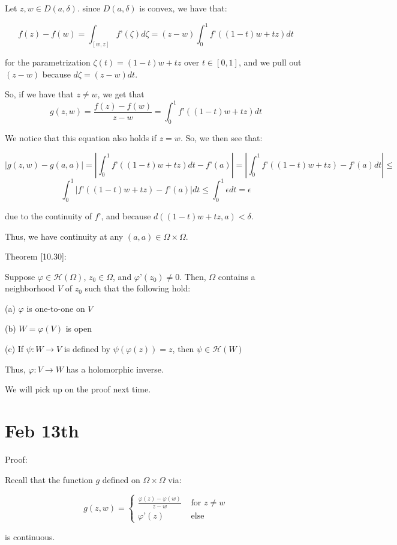 \documentclass[10pt]{article}
\newcommand{\calH}{\mathcal{H}}
\begin{document}
Let $z,w \in D(a,\delta)$. since $D(a, \delta)$ is convex, we have that:

$$ f(z) - f(w) = \int_{[w,z]} f’(\zeta) d\zeta = (z-w) \int_0^1 f’((1-t)w + tz) dt $$

for the parametrization $\zeta(t) = (1-t)w + tz$ over $t \in [0,1]$, and we pull out $(z-w)$ because $d\zeta = (z-w) dt$.

So, if we have that $z \not = w$, we get that $$g(z,w) = \frac{f(z) - f(w)}{z-w} = \int_0^1 f’((1-t)w + tz) dt $$

We notice that this equation also holds if $z = w$. So, we then see that:

$$ | g(z,w) - g(a,a) | = \left| \int_0^1 f’((1-t)w + tz) dt - f’(a) \right| = \left|  \int_0^1 f’((1-t)w + tz)- f’(a) dt \right| \leq $$ 
$$ \int_0^1 | f’((1-t)w + tz)- f’(a)| dt  \leq \int_0^1 \epsilon dt = \epsilon$$

due to the continuity of $f’$, and because $d((1-t)w + tz, a) < \delta$.

Thus, we have continuity at any $(a,a) \in \Omega \times \Omega$.

Theorem [10.30]:

Suppose $\varphi \in \calH(\Omega)$, $z_0 \in \Omega$, and $\varphi’(z_0) \not = 0$. Then, $\Omega$ contains a neighborhood $V$ of $z_0$ such that the following hold:

(a) $\varphi$ is one-to-one on $V$

(b) $W = \varphi(V)$ is open

(c) If $\psi: W \to V$ is defined by $\psi(\varphi(z)) = z$, then $\psi \in \calH(W)$

Thus, $\varphi: V \to W$ has a holomorphic inverse. 

We will pick up on the proof next time.

\section*{Feb 13th}

Proof:

Recall that the function $g$ defined on $\Omega \times \Omega$ via:

$$ g(z,w) = \begin{cases} \frac{\varphi(z) - \varphi(w)}{z - w} & \text{ for } z \not = w \\ \varphi’(z) & \text{ else } \end{cases} $$

is continuous. 
\end{document}
